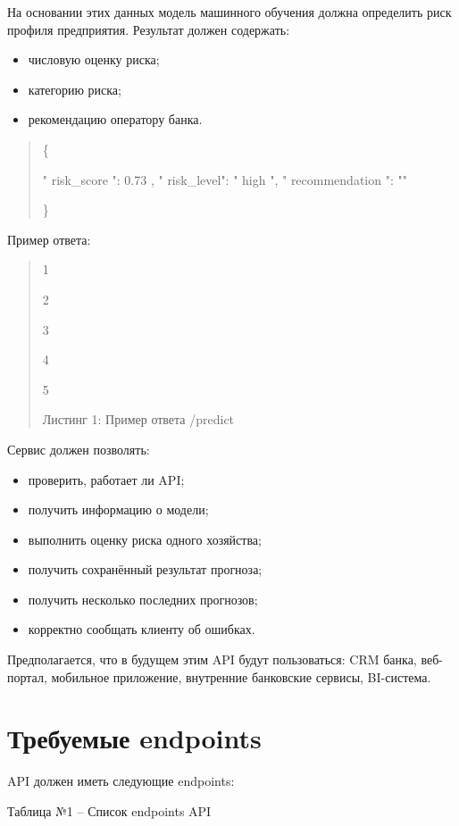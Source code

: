 \documentclass[
]{article}
\begin{document}
На основании этих данных модель машинного обучения должна определить
риск профиля предприятия. Результат должен содержать:

\begin{itemize}
\item
  числовую оценку риска;
\item
  категорию риска;
\item
  рекомендацию оператору банка.
\end{itemize}

\begin{quote}
\{

" risk\_score ": 0.73 , " risk\_level": " high ", " recommendation ": ""

\}
\end{quote}

Пример ответа:

\begin{quote}
1

2

3

4

5

Листинг 1: Пример ответа /predict
\end{quote}

Сервис должен позволять:

\begin{itemize}
\item
  проверить, работает ли API;
\item
  получить информацию о модели;
\item
  выполнить оценку риска одного хозяйства;
\item
  получить сохранённый результат прогноза;
\item
  получить несколько последних прогнозов;
\item
  корректно сообщать клиенту об ошибках.
\end{itemize}

Предполагается, что в будущем этим API будут пользоваться: CRM банка,
веб-портал, мобильное приложение, внутренние банковские сервисы,
BI-система.

\section{Требуемые
endpoints}\label{ux442ux440ux435ux431ux443ux435ux43cux44bux435-endpoints}

API должен иметь следующие endpoints:

Таблица №1 -- Список endpoints API
\end{document}
